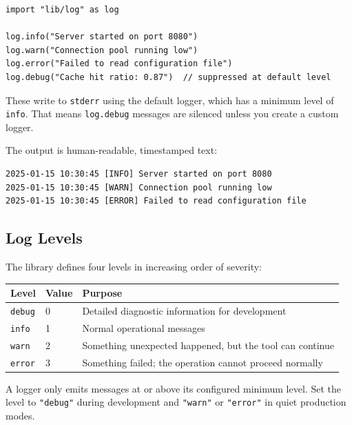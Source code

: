 \begin{lstlisting}[language=Lattice, caption={Module-level logging}]
import "lib/log" as log

log.info("Server started on port 8080")
log.warn("Connection pool running low")
log.error("Failed to read configuration file")
log.debug("Cache hit ratio: 0.87")  // suppressed at default level
\end{lstlisting}

These write to \texttt{stderr} using the default logger, which has a minimum level of \lstinline|info|.
That means \lstinline|log.debug| messages are silenced unless you create a custom logger.

The output is human-readable, timestamped text:

\begin{lstlisting}[language={}, caption={Default log output format}]
2025-01-15 10:30:45 [INFO] Server started on port 8080
2025-01-15 10:30:45 [WARN] Connection pool running low
2025-01-15 10:30:45 [ERROR] Failed to read configuration file
\end{lstlisting}

\subsection{Log Levels}\label{sec:log-levels}


The library defines four levels in increasing order of severity:

\begin{center}
\begin{tabular}{llp{7cm}}
\toprule
\textbf{Level} & \textbf{Value} & \textbf{Purpose} \\
\midrule
\lstinline|debug| & 0 & Detailed diagnostic information for development \\
\lstinline|info|  & 1 & Normal operational messages \\
\lstinline|warn|  & 2 & Something unexpected happened, but the tool can continue \\
\lstinline|error| & 3 & Something failed; the operation cannot proceed normally \\
\bottomrule
\end{tabular}
\end{center}

A logger only emits messages at or above its configured minimum level.
Set the level to \lstinline|"debug"| during development and \lstinline|"warn"| or \lstinline|"error"| in quiet production modes.

